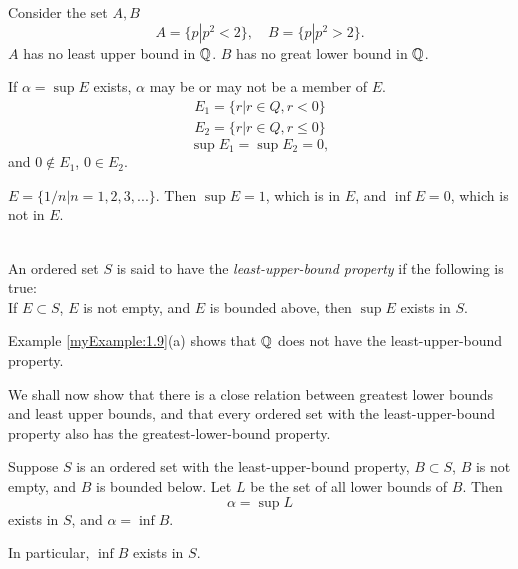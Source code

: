 \begin{myExample}
    \label{myExample:1.9}
    \begin{asparaenum}[(a)]
        \item Consider the set $A, B$
        \begin{equation*}
            A = \{p|p^2 < 2\},\quad
            B = \{p|p^2 > 2\}.
        \end{equation*}
        $A$ has no least upper bound in ${\protect\mathbb Q} $.
        $B$ has no great lower bound in ${\protect\mathbb Q} $.    
        \item If $\alpha = \sup E$ exists, $\alpha$ may be or may not be a member of $E$.
        \begin{align*}
            E_1 = \{r |r\in Q, r < 0\}\\
            E_2 = \{r |r\in Q, r \leq 0\}
        \end{align*}
        \begin{equation*}
            \sup E_1 = \sup E_2 = 0,
        \end{equation*}
        and $0\not\in E_1$, $0\in E_2$.
        \item $E = \{1/n | n = 1,2,3,...\}$. 
        Then $\sup E = 1$, which is in $E$, 
        and $\inf E = 0$, which is not in $E$.
    \end{asparaenum}
\end{myExample}

\begin{myDef}
    \label{myDef:1.10}
    {\color{red}{least-upper-bound property}}\\
    An ordered set $S$ is said to have the \emph{least-upper-bound property} 
    if the following is true:\\
    If $E \subset S$, $E$ is not empty, and $E$ is bounded above, then $\sup E$ exists in $S$.
\end{myDef}

Example \ref{myExample:1.9}(a) shows that ${\protect\mathbb Q} $ does not have the least-upper-bound property.

We shall now show that 
there is a close relation between greatest lower bounds and least upper bounds, 
and that every ordered set with the least-upper-bound property 
also has the greatest-lower-bound property.


\begin{thm}
    \label{thm:1.11}
    Suppose $S$ is an ordered set with the least-upper-bound property,
    $B \subset S$, $B$ is not empty, and $B$ is bounded below. 
    Let $L$ be the set of all lower bounds of $B$. 
    Then
    \begin{equation*}
        \alpha = \sup L
    \end{equation*}
    exists in $S$, and $\alpha = \inf B$.

    In particular, $\inf B$ exists in $S$.
\end{thm}

